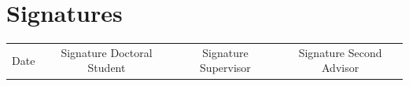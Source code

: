\documentclass[11pt]{article}
\begin{document}
%















\section*{Signatures}

\begin{table}[h!]
\begin{tabular}{llll}
                         &                                                &                                          &                                              \\ \hline
\multicolumn{1}{c}{Date} & \multicolumn{1}{c}{Signature Doctoral Student} & \multicolumn{1}{c}{Signature Supervisor} & \multicolumn{1}{c}{Signature Second Advisor}
\end{tabular}
\end{table}
\end{document}
